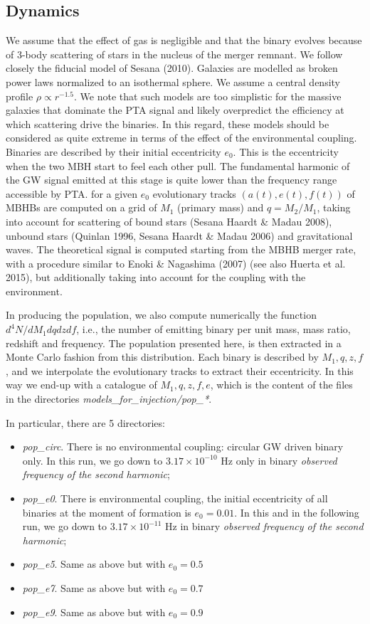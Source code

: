 \documentclass[prd,aps,eqsecnum]{revtex4}
\begin{document}
\subsection{Dynamics}
We assume that the effect of gas is negligible and that the binary evolves because of 3-body scattering of stars in the nucleus of the merger remnant. We follow closely the fiducial model of Sesana (2010). Galaxies are modelled as broken power laws normalized to an isothermal sphere. We assume a central density profile $\rho\propto r^{-1.5}$. We note that such models are too simplistic for the massive galaxies that dominate the PTA signal and likely overpredict the efficiency at which scattering drive the binaries. In this regard, these models should be considered as quite extreme in terms of the effect of the environmental coupling. Binaries are described by their initial eccentricity $e_0$. This is the eccentricity when the two MBH start to feel each other pull. The fundamental harmonic of the GW signal emitted at this stage is quite lower than the frequency range accessible by PTA. for a given $e_0$ evolutionary tracks $(a(t),e(t),f(t))$ of MBHBs are computed on a grid of $M_1$ (primary mass) and $q=M_2/M_1$, taking into account for scattering of bound stars (Sesana Haardt \& Madau 2008), unbound stars (Quinlan 1996, Sesana Haardt \& Madau 2006) and gravitational waves. The theoretical signal is computed starting from the MBHB merger rate, with a procedure similar to Enoki \& Nagashima (2007) (see also Huerta et al. 2015), but additionally taking into account for the coupling with the environment.

In producing the population, we also compute numerically the function $d^4N/dM_1dqdzdf$, i.e., the number of emitting binary per unit mass, mass ratio, redshift and frequency. The population presented here, is then extracted in a Monte Carlo fashion from this distribution. Each binary is described by $M_1,q,z,f$, and we interpolate the evolutionary tracks to extract their eccentricity. In this way we end-up with a catalogue of $M_1,q,z,f,e$, which is the content of the files in the directories {\it models\_for\_injection/pop\_*}.

In particular, there are 5 directories:
\begin{itemize}
\item {\it pop\_circ}. There is no environmental coupling: circular GW driven binary only. In this run, we go down to $3.17\times10^{-10}$ Hz only in binary {\it observed frequency of the second harmonic};
\item {\it pop\_e0}. There is environmental coupling, the initial eccentricity of all binaries at the moment of formation is $e_0=0.01$. In this and in the following run, we go down to $3.17\times10^{-11}$ Hz in binary {\it observed frequency of the second harmonic};
\item {\it pop\_e5}. Same as above but with $e_0=0.5$  
\item {\it pop\_e7}. Same as above but with $e_0=0.7$  
\item {\it pop\_e9}. Same as above but with $e_0=0.9$  
\end{itemize}
\end{document}
